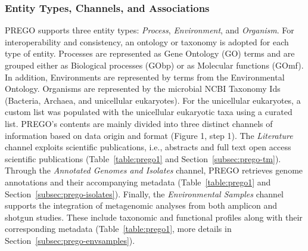    \subsubsection*{Entity Types, Channels, and Associations}
   \label{subsec:prego-terms}

   PREGO supports three entity types: \textit{Process}, \textit{Environment}, and \textit{Organism}. 
   For interoperability and consistency, an ontology or taxonomy is adopted for each type of entity.
   Processes are represented as Gene Ontology (GO) terms and are grouped either as Biological processes (GObp) or as Molecular functions (GOmf). In addition, Environments are represented by terms from the Environmental Ontology. Organisms are represented by the microbial NCBI Taxonomy Ids (Bacteria, Archaea, and unicellular eukaryotes). For the unicellular eukaryotes, a custom list was populated with the unicellular eukaryotic taxa using a curated list.
   PREGO's contents are mainly divided into three distinct channels of information based on data origin and format (Figure 1, step 1). The \textit{Literature} channel exploits scientific publications, i.e., abstracts and full text open access scientific publications (Table~\ref{table:prego1} and Section~\ref{subsec:prego-tm}). 
   Through the \textit{Annotated Genomes and Isolates} channel, PREGO retrieves genome annotations and their accompanying metadata (Table~\ref{table:prego1} and Section~\ref{subsec:prego-isolates}). 
   Finally, the \textit{Environmental Samples} channel supports the integration of metagenomic analyses from both amplicon and shotgun studies. 
   These include taxonomic and functional profiles along with their corresponding metadata (Table~\ref{table:prego1}, more details in Section~\ref{subsec:prego-envsamples}).


